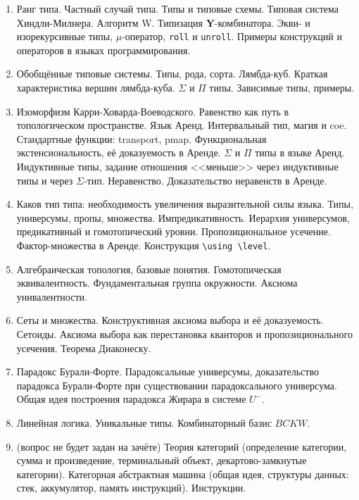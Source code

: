 \documentclass[11pt,a4paper,oneside]{article}
\begin{document}
\begin{enumerate}
Экзистенциальные типы. Конструкции \texttt{pack} и \texttt{abstype}. Абстрактные типы данных. 
\item Ранг типа. Частный случай типа. Типы и типовые схемы. Типовая система Хиндли-Милнера. Алгоритм W.
Типизация \textbf{Y}-комбинатора. Экви- и изорекурсивные типы, $\mu$-оператор, \texttt{roll} и \texttt{unroll}.
Примеры конструкций и операторов в языках программирования.
\item Обобщённые типовые системы. Типы, рода, сорта. Лямбда-куб. Краткая характеристика вершин лямбда-куба. 
$\Sigma$ и $\Pi$ типы. Зависимые типы, примеры.
\item Изоморфизм Карри-Ховарда-Воеводского.
Равенство как путь в топологическом пространстве. Язык Аренд. Интервальный тип, магия и coe. 
Стандартные функции: transport, pmap. 
Функциональная экстенсиональность, её доказуемость в Аренде. $\Sigma$ и $\Pi$ типы в языке Аренд. 
Индуктивные типы, задание отношения <<меньше>> через индуктивные типы и через $\Sigma$-тип. 
Неравенство. Доказательство неравенств в Аренде.
\item Каков тип типа: необходимость увеличения выразительной силы языка.
Типы, универсумы, пропы, множества. Импредикативность. Иерархия универсумов, предикативный и гомотопический 
уровни. Пропозициональное усечение. Фактор-множества в Аренде. Конструкция \verb!\using \level!. 
\item Алгебраическая топология, базовые понятия. Гомотопическая эквивалентность. Фундаментальная группа окружности. 
Аксиома унивалентности.
\item Сеты и множества. Конструктивная аксиома выбора и её доказуемость. 
Сетоиды. Аксиома выбора как перестановка кванторов и пропозиционального усечения. 
Теорема Диаконеску. 
\item Парадокс Бурали-Форте. Парадоксальные универсумы, доказательство парадокса Бу\-ра\-ли-Форте при 
существовании парадоксального универсума. Общая идея построения парадокса Жирара в системе $U^-$.
\item Линейная логика. Уникальные типы. Комбинаторный базис $BCKW$.
\item (вопрос не будет задан на зачёте) Теория категорий (определение категории, сумма и произведение, терминальный объект,
декартово-замкнутые категории). Категорная абстрактная машина (общая идея, структуры данных: 
стек, аккумулятор, память инструкций). Инструкции.
\end{enumerate}
\end{document}
